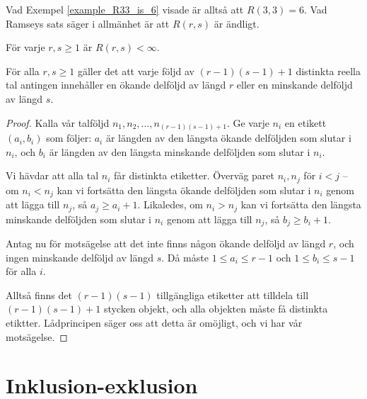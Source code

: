 \documentclass[nobib]{tufte-handout}
\begin{document}
Vad Exempel \ref{example_R33_is_6} visade är alltså att $R(3,3) = 6$. Vad Ramseys sats säger i allmänhet är att $R(r,s)$ är ändligt.

\begin{theorem}\label{ramseys_theorem}
  För varje $r, s \geq 1$ är $R(r,s) < \infty$.
\end{theorem}

\begin{theorem}
  För alla $r,s \geq 1$ gäller det att varje följd av $(r-1)(s-1) + 1$ distinkta reella tal antingen innehåller en ökande delföljd av längd $r$ eller en minskande delföljd av längd $s$.

  \begin{proof}
    Kalla vår talföljd $n_1, n_2, \ldots, n_{(r-1)(s-1)+1}$. Ge varje $n_i$ en etikett $(a_i, b_i)$ som följer: $a_i$ är längden av den längsta ökande delföljden som slutar i $n_i$, och $b_i$ är längden av den längsta minskande delföljden som slutar i $n_i$.

    Vi hävdar att alla tal $n_i$ får distinkta etiketter. Överväg paret $n_i, n_j$ för $i < j$ -- om $n_i < n_j$ kan vi fortsätta den längsta ökande delföljden som slutar i $n_i$ genom att lägga till $n_j$, så $a_j \geq a_i + 1$. Likaledes, om $n_i > n_j$ kan vi fortsätta den längsta minskande delföljden som slutar i $n_i$ genom att lägga till $n_j$, så $b_j \geq b_i + 1$.

    Antag nu för motsägelse att det inte finns någon ökande delföljd av längd $r$, och ingen minskande delföljd av längd $s$. Då måste $1 \leq a_i \leq r-1$ och $1\leq b_i \leq s-1$ för alla $i$.

    Alltså finns det $(r-1)(s-1)$ tillgängliga etiketter att tilldela till $(r-1)(s-1) + 1$ stycken objekt, och alla objekten måste få distinkta etiktter. Lådprincipen säger oss att detta är omöjligt, och vi har vår motsägelse.
  \end{proof}
\end{theorem}

\section{Inklusion-exklusion}
\end{document}
